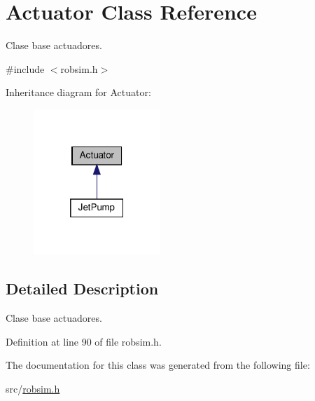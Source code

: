 \hypertarget{classActuator}{}\section{Actuator Class Reference}
\label{classActuator}


Clase base actuadores.  




{\ttfamily \#include $<$robsim.\+h$>$}



Inheritance diagram for Actuator\+:
\nopagebreak
\begin{figure}[H]
\begin{center}
\leavevmode
\includegraphics[width=136pt]{classActuator__inherit__graph}
\end{center}
\end{figure}


\subsection{Detailed Description}
Clase base actuadores. 

Definition at line 90 of file robsim.\+h.



The documentation for this class was generated from the following file\+:\begin{DoxyCompactItemize}
\item 
src/\hyperlink{robsim_8h}{robsim.\+h}\end{DoxyCompactItemize}
